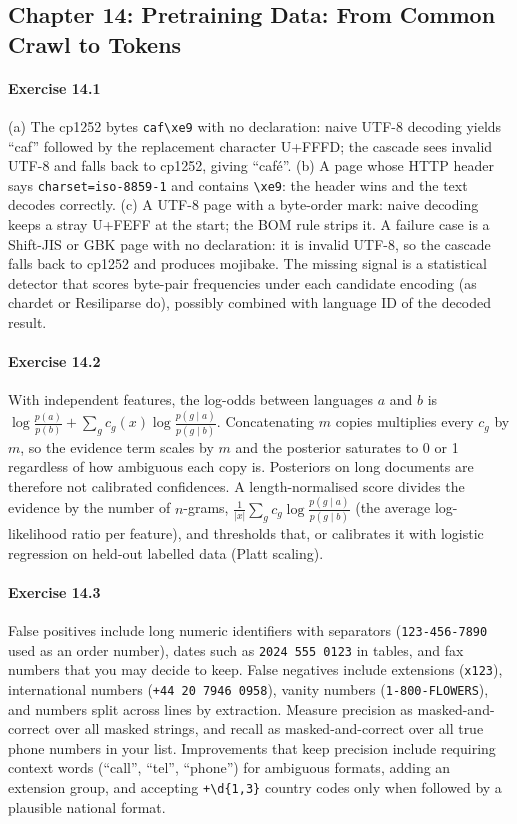 \subsection*{Chapter 14: Pretraining Data: From Common Crawl to Tokens}

\paragraph{Exercise 14.1} (a) The cp1252 bytes \texttt{caf\textbackslash xe9} with no
declaration: naive UTF-8 decoding yields ``caf'' followed by the replacement character U+FFFD;
the cascade sees invalid UTF-8 and falls back to cp1252, giving ``café''. (b) A page whose HTTP header
says \texttt{charset=iso-8859-1} and contains \texttt{\textbackslash xe9}: the header wins and the
text decodes correctly. (c) A UTF-8 page with a byte-order mark: naive decoding keeps a stray
U+FEFF at the start; the BOM rule strips it. A failure case is a Shift-JIS or GBK page with no
declaration: it is invalid UTF-8, so the cascade falls back to cp1252 and produces mojibake.
The missing signal is a statistical detector that scores byte-pair frequencies under each
candidate encoding (as chardet or Resiliparse do), possibly combined with language ID of the
decoded result.

\paragraph{Exercise 14.2} With independent features, the log-odds between languages $a$ and $b$ is
$\log\frac{p(a)}{p(b)} + \sum_g c_g(x)\log\frac{p(g\mid a)}{p(g\mid b)}$. Concatenating $m$ copies
multiplies every $c_g$ by $m$, so the evidence term scales by $m$ and the posterior saturates
to 0 or 1 regardless of how ambiguous each copy is. Posteriors on long documents are therefore not
calibrated confidences. A length-normalised score divides the evidence by the number of
$n$-grams, $\frac{1}{|x|}\sum_g c_g\log\frac{p(g\mid a)}{p(g\mid b)}$ (the average log-likelihood
ratio per feature), and thresholds that, or calibrates it with logistic regression on held-out
labelled data (Platt scaling).

\paragraph{Exercise 14.3} False positives include long numeric identifiers with separators
(\texttt{123-456-7890} used as an order number), dates such as \texttt{2024 555 0123} in tables,
and fax numbers that you may decide to keep. False negatives include extensions
(\texttt{x123}), international numbers (\texttt{+44 20 7946 0958}), vanity numbers
(\texttt{1-800-FLOWERS}), and numbers split across lines by extraction. Measure precision as
masked-and-correct over all masked strings, and recall as masked-and-correct over all true phone numbers in your list.
Improvements that keep precision include requiring context words (``call'', ``tel'', ``phone'') for
ambiguous formats, adding an extension group, and accepting \texttt{+\textbackslash d\{1,3\}}
country codes only when followed by a plausible national format.

